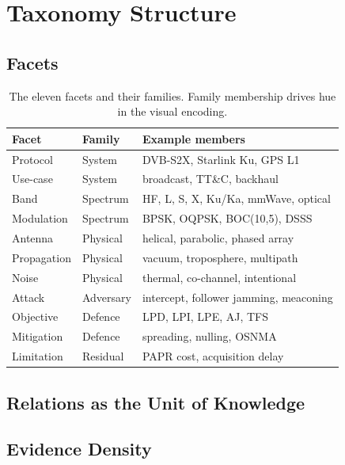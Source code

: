 \documentclass[journal]{IEEEtran}
\begin{document}
\section{Taxonomy Structure}

\subsection{Facets}

\begin{table}[t]
\caption{The eleven facets and their families. Family membership drives
hue in the visual encoding.}
\label{tab:facets}
\centering
\footnotesize
\begin{tabular}{@{}lll@{}}
\toprule
\textbf{Facet} & \textbf{Family} & \textbf{Example members} \\
\midrule
Protocol     & System     & DVB-S2X, Starlink Ku, GPS L1 \\
Use-case     & System     & broadcast, TT\&C, backhaul \\
Band         & Spectrum   & HF, L, S, X, Ku/Ka, mmWave, optical \\
Modulation   & Spectrum   & BPSK, OQPSK, BOC(10,5), DSSS \\
Antenna      & Physical   & helical, parabolic, phased array \\
Propagation  & Physical   & vacuum, troposphere, multipath \\
Noise        & Physical   & thermal, co-channel, intentional \\
Attack       & Adversary  & intercept, follower jamming, meaconing \\
Objective    & Defence    & LPD, LPI, LPE, AJ, TFS \\
Mitigation   & Defence    & spreading, nulling, OSNMA \\
Limitation   & Residual   & PAPR cost, acquisition delay \\
\bottomrule
\end{tabular}
\end{table}


\subsection{Relations as the Unit of Knowledge}


\subsection{Evidence Density}
\end{document}

